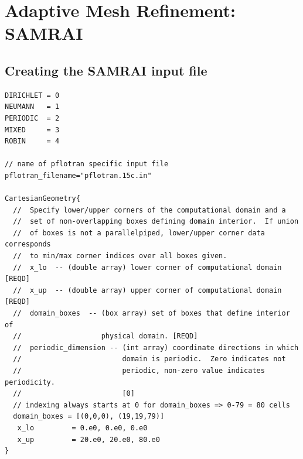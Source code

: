 \documentclass[12pt]{article}
\begin{document}
\section{Adaptive Mesh Refinement: SAMRAI}

\subsection{Creating the SAMRAI input file}

\footnotesize
\begin{verbatim}
DIRICHLET = 0
NEUMANN   = 1
PERIODIC  = 2
MIXED     = 3
ROBIN     = 4

// name of pflotran specific input file
pflotran_filename="pflotran.15c.in"

CartesianGeometry{
  //  Specify lower/upper corners of the computational domain and a
  //  set of non-overlapping boxes defining domain interior.  If union 
  //  of boxes is not a parallelpiped, lower/upper corner data corresponds 
  //  to min/max corner indices over all boxes given.
  //  x_lo  -- (double array) lower corner of computational domain [REQD]
  //  x_up  -- (double array) upper corner of computational domain [REQD]
  //  domain_boxes  -- (box array) set of boxes that define interior of 
  //                   physical domain. [REQD]
  //  periodic_dimension -- (int array) coordinate directions in which 
  //                        domain is periodic.  Zero indicates not
  //                        periodic, non-zero value indicates periodicity.
  //                        [0]
  // indexing always starts at 0 for domain_boxes => 0-79 = 80 cells
  domain_boxes = [(0,0,0), (19,19,79)]
   x_lo         = 0.e0, 0.e0, 0.e0  
   x_up         = 20.e0, 20.e0, 80.e0
}


\end{verbatim}
\end{document}
